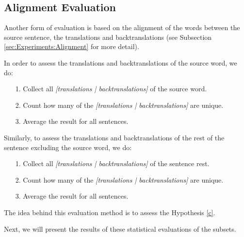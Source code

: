 \subsection{Alignment Evaluation}
\label{sec:Experiments:Statistics:Alignment}
Another form of evaluation is based on the alignment of the words between the source sentence, the translations and backtranslations (see Subsection \ref{sec:Experiments:Alignment} for more detail).

In order to assess the translations and backtranslations of the source word, we do:
\begin{enumerate}
    \item[1. ] Collect all \textit{[translations | backtranslations]} of the source word.
    \item[2. ] Count how many of the \textit{[translations | backtranslations]} are unique.
    \item[3. ] Average the result for all sentences.
\end{enumerate}

Similarly, to assess the translations and backtranslations of the rest of the sentence excluding the source word, we do:
\begin{enumerate}
    \item[1. ] Collect all \textit{[translations | backtranslations]} of the sentence rest.
    \item[2. ] Count how many of the \textit{[translations | backtranslations]} are unique.
    \item[3. ] Average the result for all sentences.
\end{enumerate}

The idea behind this evaluation method is to assess the Hypothesis \ref{c}.

Next, we will present the results of these statistical evaluations of the subsets.


